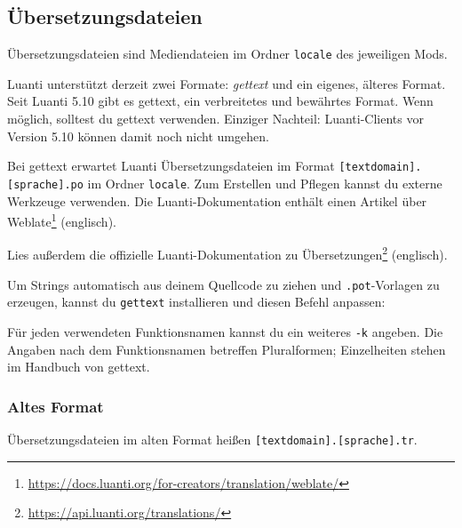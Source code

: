 \subsection{Übersetzungsdateien}\label{uxfcbersetzungsdateien}

Übersetzungsdateien sind Mediendateien im Ordner \texttt{locale} des
jeweiligen Mods.

Luanti unterstützt derzeit zwei Formate: \emph{gettext} und ein eigenes,
älteres Format. Seit Luanti 5.10 gibt es gettext, ein verbreitetes und
bewährtes Format. Wenn möglich, solltest du gettext verwenden. Einziger
Nachteil: Luanti-Clients vor Version 5.10 können damit noch nicht
umgehen.

Bei gettext erwartet Luanti Übersetzungsdateien im Format
\texttt{[textdomain].\allowbreak{}[sprache].\allowbreak{}po} im Ordner
\texttt{locale}. Zum Erstellen und Pflegen kannst du externe Werkzeuge
verwenden. Die Luanti-Dokumentation enthält einen Artikel über
Weblate\footnote{\url{https://docs.luanti.org/for-creators/translation/weblate/}}
(englisch).

Lies außerdem die offizielle Luanti-Dokumentation zu
Übersetzungen\footnote{\url{https://api.luanti.org/translations/}}
(englisch).

Um Strings automatisch aus deinem Quellcode zu ziehen und
\texttt{.\allowbreak{}pot}-Vorlagen zu erzeugen, kannst du
\texttt{gettext} installieren und diesen Befehl anpassen:

\begin{Shaded}
\begin{Highlighting}[]
\end{Highlighting}
\end{Shaded}

Für jeden verwendeten Funktionsnamen kannst du ein weiteres \texttt{-k}
angeben. Die Angaben nach dem Funktionsnamen betreffen Pluralformen;
Einzelheiten stehen im Handbuch von gettext.

\subsubsection{Altes Format}\label{altes-format}

Übersetzungsdateien im alten Format heißen
\texttt{[textdomain].\allowbreak{}[sprache].\allowbreak{}tr}.

